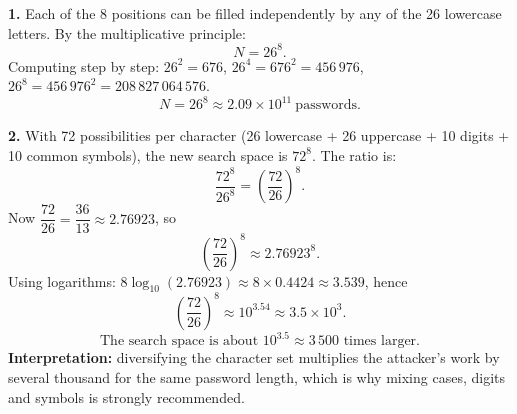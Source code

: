 \documentclass[11pt]{article}
\begin{document}
\begin{corrige}
\textbf{1.} Each of the 8 positions can be filled independently by any of the 26 lowercase letters. By the multiplicative principle:
\[
N = 26^8.
\]
Computing step by step: $26^2 = 676$, $26^4 = 676^2 = 456\,976$, $26^8 = 456\,976^2 = 208\,827\,064\,576$.
\[
\boxed{N = 26^8 \approx 2.09 \times 10^{11}\ \text{passwords}.}
\]

\textbf{2.} With 72 possibilities per character (26 lowercase + 26 uppercase + 10 digits + 10 common symbols), the new search space is $72^8$. The ratio is:
\[
\frac{72^8}{26^8} = \left(\frac{72}{26}\right)^8.
\]
Now $\dfrac{72}{26} = \dfrac{36}{13} \approx 2.76923$, so
\[
\left(\frac{72}{26}\right)^8 \approx 2.76923^8.
\]
Using logarithms: $8 \log_{10}(2.76923) \approx 8 \times 0.4424 \approx 3.539$, hence
\[
\left(\frac{72}{26}\right)^8 \approx 10^{3.54} \approx 3.5 \times 10^{3}.
\]
\[
\boxed{\text{The search space is about } 10^{3.5} \approx 3\,500 \text{ times larger.}}
\]
\textbf{Interpretation:} diversifying the character set multiplies the attacker's work by several thousand for the same password length, which is why mixing cases, digits and symbols is strongly recommended.
\end{corrige}
\end{document}
